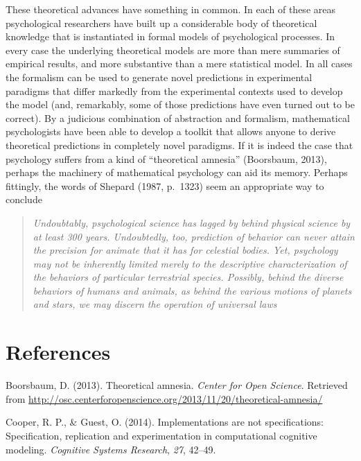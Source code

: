 \documentclass[english,doc]{apa6}
\begin{document}
These theoretical advances have something in common. In each of these areas psychological researchers have built up a considerable body of theoretical knowledge that is instantiated in formal models of psychological processes. In every case the underlying theoretical models are more than mere summaries of empirical results, and more substantive than a mere statistical model. In all cases the formalism can be used to generate novel predictions in experimental paradigms that differ markedly from the experimental contexts used to develop the model (and, remarkably, some of those predictions have even turned out to be correct). By a judicious combination of abstraction and formalism, mathematical psychologists have been able to develop a toolkit that allows anyone to derive theoretical predictions in completely novel paradigms. If it is indeed the case that psychology suffers from a kind of ``theoretical amnesia'' (Boorsbaum, 2013), perhaps the machinery of mathematical psychology can aid its memory. Perhaps fittingly, the words of Shepard (1987, p.~1323) seem an appropriate way to conclude

\begin{quote}
\emph{Undoubtably, psychological science has lagged by behind physical science by at least 300 years. Undoubtedly, too, prediction of behavior can never attain the precision for animate that it has for celestial bodies. Yet, psychology may not be inherently limited merely to the descriptive characterization of the behaviors of particular terrestrial species. Possibly, behind the diverse behaviors of humans and animals, as behind the various motions of planets and stars, we may discern the operation of universal laws}
\end{quote}

\hypertarget{references}{%
\section{References}\label{references}}

\hypertarget{refs}{}
\leavevmode\hypertarget{ref-boorsbaum2013theoretical}{}%
Boorsbaum, D. (2013). Theoretical amnesia. \emph{Center for Open Science}. Retrieved from \url{http://osc.centerforopenscience.org/2013/11/20/theoretical-amnesia/}

\leavevmode\hypertarget{ref-cooper2014implementations}{}%
Cooper, R. P., \& Guest, O. (2014). Implementations are not specifications: Specification, replication and experimentation in computational cognitive modeling. \emph{Cognitive Systems Research}, \emph{27}, 42--49.
\end{document}
